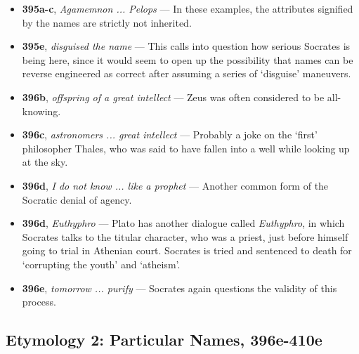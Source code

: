 \documentclass[12pt]{article}
\begin{document}
\begin{itemize}
\item \textbf{395a-c}, \textit{Agamemnon ... Pelops} --- In these examples, the attributes signified by the names are strictly not inherited.

\item \textbf{395e}, \textit{disguised the name} --- This calls into question how serious Socrates is being here, since it would seem to open up the possibility that names can be reverse engineered as correct after assuming a series of `disguise' maneuvers.

\item \textbf{396b}, \textit{offspring of a great intellect} --- Zeus was often considered to be all-knowing.

\item \textbf{396c}, \textit{astronomers ... great intellect} --- Probably a joke on the `first' philosopher Thales, who was said to have fallen into a well while looking up at the sky.

\item \textbf{396d}, \textit{I do not know ... like a prophet} --- Another common form of the Socratic denial of agency.

\item \textbf{396d}, \textit{Euthyphro} --- Plato has another dialogue called \textit{Euthyphro}, in which Socrates talks to the titular character, who was a priest, just before himself going to trial in Athenian court. Socrates is tried and sentenced to death for `corrupting the youth' and `atheism'.

\item \textbf{396e}, \textit{tomorrow ... purify} --- Socrates again questions the validity of this process.

\end{itemize}

\subsection{Etymology 2: Particular Names, 396e-410e }
\end{document}

